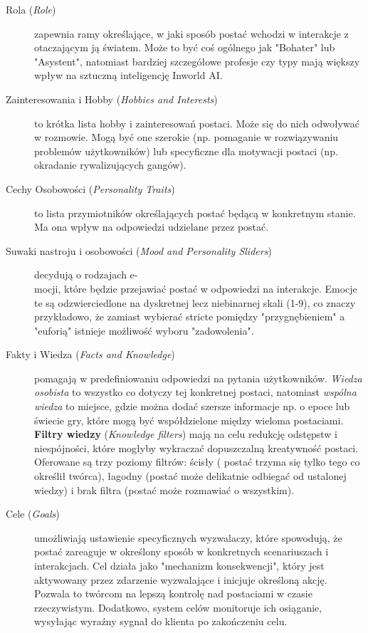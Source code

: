 \begin{description}
    \item[Rola (\textit{Role})] zapewnia ramy określające, w jaki sposób postać wchodzi w interakcje z otaczającym ją
          światem. Może to być coś ogólnego jak "Bohater" lub "Asystent", natomiast bardziej szczegółowe
          profesje czy typy mają większy wpływ na sztuczną inteligencję Inworld AI\cite{inworld_docs}.

    \item[Zainteresowania i Hobby (\textit{Hobbies and Interests})] to krótka lista hobby i zainteresowań postaci. Może
          się do nich odwoływać w rozmowie. Mogą być one szerokie (np. pomaganie w rozwiązywaniu problemów
          użytkowników) lub specyficzne dla motywacji postaci (np. okradanie rywalizujących gangów)\cite{inworld_docs}.

    \item[Cechy Osobowości (\textit{Personality Traits})] to lista przymiotników określających postać będącą
          w konkretnym stanie. Ma ona wpływ na odpowiedzi udzielane przez postać\cite{inworld_docs}.

    \item[Suwaki nastroju i osobowości (\textit{Mood and Personality Sliders})] decydują o rodzajach e-\\
          mocji, które będzie przejawiać postać w odpowiedzi na interakcje. Emocje te są odzwierciedlone
          na dyskretnej lecz niebinarnej skali (1-9), co znaczy przykładowo, że zamiast wybierać
          stricte pomiędzy "przygnębieniem" a "euforią" istnieje możliwość wyboru "zadowolenia"\cite{inworld_docs}.

    \item[Fakty i Wiedza (\textit{Facts and Knowledge})] pomagają w predefiniowaniu odpowiedzi na pytania użytkowników.
          \textit{Wiedza osobista} to wszystko co dotyczy tej konkretnej postaci, natomiast \textit{wspólna wiedza} to miejsce, gdzie można
          dodać szersze informacje np. o epoce lub świecie gry, które mogą być współdzielone między wieloma
          postaciami. \textbf{Filtry wiedzy} (\textit{Knowledge filters}) mają na celu redukcję odstępstw i niespójności, które
          mogłyby wykraczać dopuszczalną kreatywność postaci. Oferowane są trzy poziomy filtrów: ścisły (
          postać trzyma się tylko tego co określił twórca), łagodny (postać może delikatnie odbiegać od
          ustalonej wiedzy) i brak filtra (postać może rozmawiać o wszystkim)\cite{inworld_docs}.

    \item[Cele (\textit{Goals})] umożliwiają ustawienie specyficznych wyzwalaczy, które spowodują, że postać
          zareaguje w określony sposób w konkretnych scenariuszach i interakcjach. Cel działa jako "mechanizm
          konsekwencji", który jest aktywowany przez zdarzenie wyzwalające i inicjuje określoną akcję. Pozwala
          to twórcom na lepszą kontrolę nad postaciami w czasie rzeczywistym. Dodatkowo, system celów
          monitoruje ich osiąganie, wysyłając wyraźny sygnał do klienta po zakończeniu celu\cite{inworld_docs}.


\end{description}

